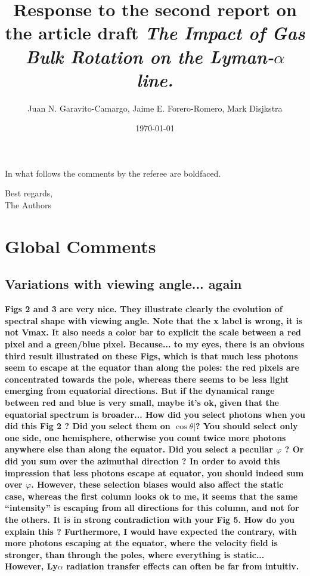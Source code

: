 \documentclass[12pt]{article}
\title{Response to the second report on the article draft \emph{The
    Impact of Gas Bulk Rotation on the Lyman-$\alpha$ line.}}
\author{Juan N. Garavito-Camargo, Jaime E. Forero-Romero, Mark Disjkstra}
\date{\today}
\begin{document}
\maketitle

In what follows the comments by the referee are boldfaced.

Best regards, \\

The Authors\\


\section*{Global Comments}

\subsection*{Variations with viewing angle... again}

{\bf Figs 2 and 3 are very nice. They illustrate clearly the evolution of spectral shape with viewing angle. Note that the x label is wrong, it is not Vmax. It also needs a color bar to explicit the scale between a red pixel and a green/blue pixel. Because... to my eyes, there is an obvious third result illustrated on these Figs, which is that much less photons seem to escape at the equator than along the poles: the red pixels are concentrated towards the pole, whereas there seems to be less light emerging from equatorial directions. But if the dynamical range between red and blue is very small, maybe it’s ok, given that the equatorial spectrum is broader...
How did you select photons when you did this Fig 2 ? Did you select them on $\cos\theta|$? You should select only one side, one hemisphere, otherwise you count twice more photons anywhere else than along the equator. Did you select a peculiar $\varphi$ ? Or did you sum over the azimuthal direction ? In order to avoid this impression that less photons escape at equator, you should indeed sum over $\varphi$. However, these selection biases would also affect the static case, whereas the first column looks ok to me, it seems that the same “intensity” is escaping from all directions for this column, and not for the others.
It is in strong contradiction with your Fig 5. How do you explain this ?
Furthermore, I would have expected the contrary, with more photons escaping at the equator, where the velocity field is stronger, than through the poles, where everything is static... However, Ly$\alpha$ radiation transfer effects can often be far from intuitiv.}
\end{document}
